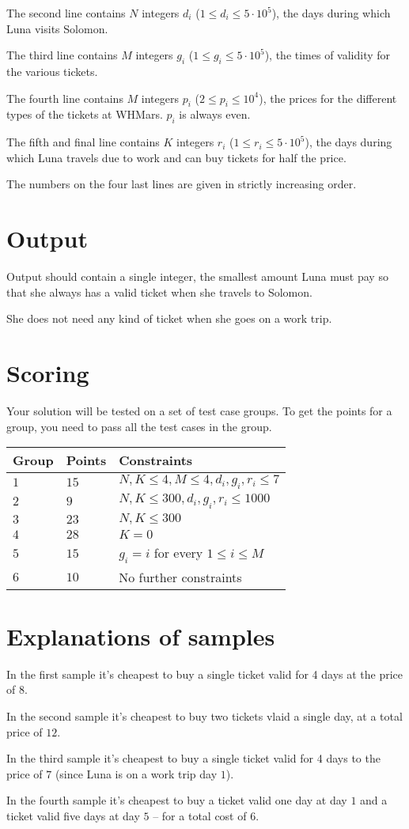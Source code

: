 The second line contains $N$ integers $d_i$ ($1 \leq d_i \leq 5\cdot10^5$), the days during which Luna visits Solomon.

The third line contains $M$ integers $g_i$ ($1 \leq g_i \leq 5\cdot10^5$), the times of validity for the various tickets.

The fourth line contains $M$ integers $p_i$ ($2 \leq p_i \leq 10^4$), the prices for the different types of the tickets at WHMars. $p_i$ is always even.

The fifth and final line contains $K$ integers $r_i$ ($1 \leq r_i \leq 5\cdot10^5$), the days during which Luna travels due to work and can buy tickets for half the price.

The numbers on the four last lines are given in strictly increasing order.

\section*{Output}
Output should contain a single integer, the smallest amount Luna must pay so that she always has a valid ticket when she travels to Solomon.

She does not need any kind of ticket when she goes on a work trip.

\section*{Scoring}
Your solution will be tested on a set of test case groups.
To get the points for a group, you need to pass all the test cases in the group.

\noindent
\begin{tabular}{| l | l | l |}
\hline
Group & Points & Constraints \\ \hline
$1$    & $15$         & $N, K\leq 4, M\leq 4, d_i,g_i,r_i\leq 7$ \\ \hline
$2$    & $9$         & $N, K\leq 300, d_i,g_i,r_i\leq 1000$ \\ \hline
$3$    & $23$         & $N, K\leq 300$ \\ \hline
$4$    & $28$         & $K=0$ \\ \hline
$5$    & $15$         & $g_i=i$ for every $1\leq i\leq M$ \\ \hline
$6$    & $10$         & No further constraints  \\ \hline
\end{tabular}

\section*{Explanations of samples}
In the first sample it's cheapest to buy a single ticket valid for 4 days at the price of $8$.

In the second sample it's cheapest to buy two tickets vlaid a single day, at a total price of $12$.

In the third sample it's cheapest to buy a single ticket valid for 4 days to the price of $7$ (since Luna is on a work trip day $1$).

In the fourth sample it's cheapest to buy a ticket valid one day at day $1$ and a ticket valid five days at day $5$ -- for a total cost of $6$.
